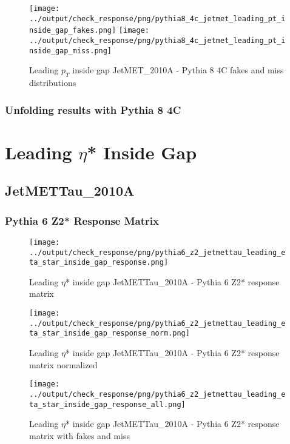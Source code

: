 \documentclass[11pt]{book}
\begin{document}
\begin{figure}[ht]
\centering
\texttt{[image: ../output/check\_response/png/pythia8\_4c\_jetmet\_leading\_pt\_inside\_gap\_fakes.png]}
\texttt{[image: ../output/check\_response/png/pythia8\_4c\_jetmet\_leading\_pt\_inside\_gap\_miss.png]}
\caption{Leading $p_{T}$ inside gap JetMET\_2010A - Pythia 8 4C fakes and miss distributions}
\label{p8_jetmet_leading_pt_inside_gap_fakesmiss}
\end{figure}


\clearpage
\subsection{Unfolding results with Pythia 8 4C}


\newpage
\chapter{Leading $\eta$* Inside Gap}
\section{JetMETTau\_2010A}
\subsection{Pythia 6 Z2* Response Matrix}

\begin{figure}[ht]
\centering
\texttt{[image: ../output/check\_response/png/pythia6\_z2\_jetmettau\_leading\_eta\_star\_inside\_gap\_response.png]}
\caption{Leading $\eta$* inside gap JetMETTau\_2010A - Pythia 6 Z2* response matrix}
\label{p6_jetmettau_leading_eta_star_inside_gap_response}
\end{figure}

\begin{figure}[ht]
\centering
\texttt{[image: ../output/check\_response/png/pythia6\_z2\_jetmettau\_leading\_eta\_star\_inside\_gap\_response\_norm.png]}
\caption{Leading $\eta$* inside gap JetMETTau\_2010A - Pythia 6 Z2* response matrix normalized}
\label{p6_jetmettau_leading_eta_star_inside_gap_response_norm}
\end{figure}

\begin{figure}[ht]
\centering
\texttt{[image: ../output/check\_response/png/pythia6\_z2\_jetmettau\_leading\_eta\_star\_inside\_gap\_response\_all.png]}
\caption{Leading $\eta$* inside gap JetMETTau\_2010A - Pythia 6 Z2* response matrix with fakes and miss}
\label{p6_jetmettau_leading_eta_star_inside_gap_response_all}
\end{figure}
\end{document}
